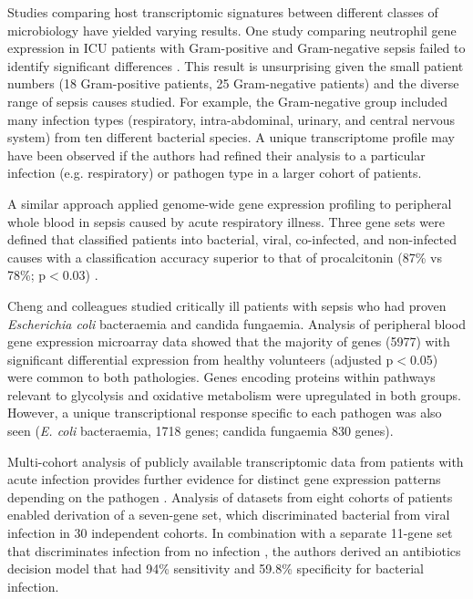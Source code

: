 Studies comparing host transcriptomic signatures between different classes of microbiology have yielded varying results. One study comparing neutrophil gene expression in ICU patients with Gram-positive and Gram-negative sepsis failed to identify significant differences \parencite{Tang2008}. This result is unsurprising given the small patient numbers (18 Gram-positive patients, 25 Gram-negative patients) and the diverse range of sepsis causes studied. For example, the Gram-negative group included many infection types (respiratory, intra-abdominal, urinary, and central nervous system) from ten different bacterial species. A unique transcriptome profile may have been observed if the authors had refined their analysis to a particular infection (e.g. respiratory) or pathogen type in a larger cohort of patients. 

A similar approach applied genome-wide gene expression profiling to peripheral whole blood in sepsis caused by acute respiratory illness. Three gene sets were defined that classified patients into bacterial, viral, co-infected, and non-infected causes with a classification accuracy superior to that of procalcitonin (87\% vs 78\%; p$<$0.03) \parencite{Tsalik2016}. 

Cheng and colleagues \parencite{Cheng2016} studied critically ill patients with sepsis who had proven \textit{Escherichia coli} bacteraemia and candida fungaemia. Analysis of peripheral blood gene expression microarray data showed that the majority of genes (5977) with significant differential expression from healthy volunteers (adjusted p$<$0.05) were common to both pathologies. Genes encoding proteins within pathways relevant to glycolysis and oxidative metabolism were upregulated in both groups. However, a unique transcriptional response specific to each pathogen was also seen (\textit{E. coli} bacteraemia, 1718 genes; candida fungaemia 830 genes). 

Multi-cohort analysis of publicly available transcriptomic data from patients with acute infection provides further evidence for distinct gene expression patterns depending on the pathogen \parencite{Sweeney2016}. Analysis of datasets from eight cohorts of patients enabled derivation of a seven-gene set, which discriminated bacterial from viral infection in 30 independent cohorts. In combination with a separate 11-gene set that discriminates infection from no infection \parencite{Sweeney2015}, the authors derived an antibiotics decision model that had 94\% sensitivity and 59.8\% specificity for bacterial infection. 


